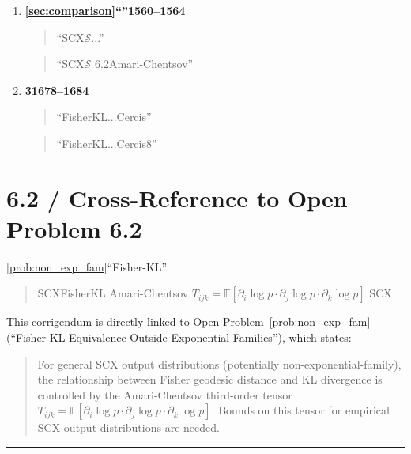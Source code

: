 \documentclass{article}
\newcommand{\Situs}{\mathcal{S}}
\newcommand{\E}{\mathbb{E}}
\begin{document}
\begin{enumerate}[label=(\arabic*)]
    \item \textbf{\ref{sec:comparison}``''1560--1564}
    
    \begin{quote}
        ``SCX$\Situs$...''
    \end{quote}
    
    \begin{quote}
        ``SCX$\Situs$
        6.2Amari-Chentsov''
    \end{quote}

    \item \textbf{31678--1684}
    
    \begin{quote}
        ``FisherKL...Cercis''
    \end{quote}
    
    \begin{quote}
        ``FisherKL...Cercis8''
    \end{quote}

\end{enumerate}

\section{6.2 / Cross-Reference to Open Problem 6.2}

\ref{prob:non_exp_fam}``Fisher-KL''


\begin{quote}
SCXFisherKL
Amari-Chentsov $T_{ijk} = \E[\partial_i \log p \cdot \partial_j \log p \cdot \partial_k \log p]$
SCX
\end{quote}

This corrigendum is directly linked to Open Problem~\ref{prob:non_exp_fam}
(``Fisher-KL Equivalence Outside Exponential Families''), which states:

\begin{quote}
For general SCX output distributions (potentially non-exponential-family),
the relationship between Fisher geodesic distance and KL divergence is controlled
by the Amari-Chentsov third-order tensor $T_{ijk} = \E[\partial_i \log p \cdot \partial_j \log p \cdot \partial_k \log p]$.
Bounds on this tensor for empirical SCX output distributions are needed.
\end{quote}

\vspace{1em}
\noindent\rule{\textwidth}{0.5pt}
\vspace{0.5em}


\end{document}

